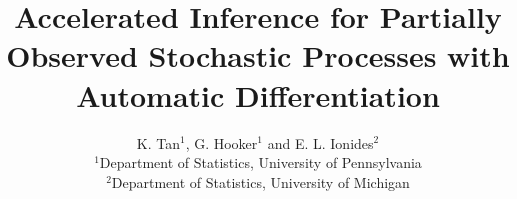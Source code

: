 \documentclass[11pt]{article}
\newcommand\arxiv[2]{#1} %
\begin{document}
\title{Accelerated Inference for Partially Observed Stochastic Processes with Automatic Differentiation}


\arxiv{ \author{K. Tan$^{1}$, G. Hooker$^{1}$ and E. L. Ionides$^{2}$
  \vspace{2mm}\\
  \small{$^{1}$Department of Statistics, University of Pennsylvania}\\
  \small{$^{2}$Department of Statistics, University of Michigan}}}{}

\arxiv{}{
\author[a]{Kevin Tan}
\author[a]{Giles Hooker}
\author[b,1]{Edward L. Ionides}
\affil[a]{University of Pennsylvania}
\affil[b]{University of Michigan}
\leadauthor{Tan}
\significancestatement{Many scientific models involve highly nonlinear stochastic dynamical systems which can be observed only via noisy and incomplete measurements. Prior to this work, iterated filtering algorithms were the only class of algorithms for maximum likelihood estimation that did not require access to the system's transition probabilities, instead needing only a simulator of the system dynamics. We leverage recent advances in automatic differentiation to propose a hybrid algorithm that requires only a differentiable simulator for maximum likelihood estimation. Our new method outperforms previous approaches on a challenging problem in epidemiology.}
\authorcontributions{K.T. and E.L.I. designed research; K.T. analyzed data; K.T., G.H. and E.L.I. performed research, K.T., G.H., and E.L.I. wrote the manuscript.}
\authordeclaration{The authors declare no competing interests.}
\correspondingauthor{\textsuperscript{1}To whom correspondence should be addressed. E-mail: kevtan@wharton.upenn.edu}
\keywords{Sequential Monte Carlo $|$ Automatic Differentiation $|$ Particle Filter $|$ Markov Process $|$ Maximum Likelihood}
}
\end{document}
